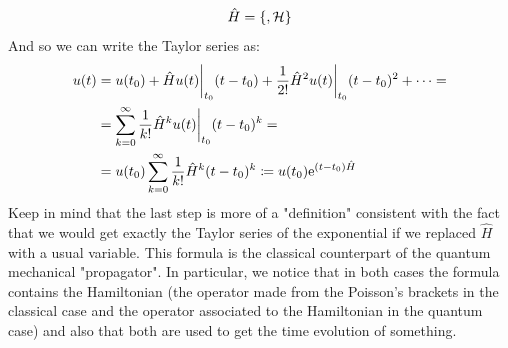 \begin{equation}
  \hat{H} = \pb{}{\hamfun}
\end{equation}
And so we can write the Taylor series as:
\begin{equation}
  \begin{split}
    u(t) &= u(t_0) + \hat{H}u(t)\bigg|_{t_0} (t - t_0) + \frac{1}{2!} \hat{H}^2u(t)\bigg|_{t_0} (t - t_0)^2 + \dots =\\
    &= \displaystyle\sum_{k=0}^\infty \dfrac{1}{k!} \hat{H}^k u(t)\bigg|_{t_0}(t - t_0)^k =\\
    &= u(t_0)\displaystyle\sum_{k=0}^\infty \dfrac{1}{k!} \hat{H}^k (t - t_0)^k \coloneqq u(t_0) \mathrm{e}^{\left(t-t_0\right)\hat{H}}
  \end{split}
\end{equation}
Keep in mind that the last step is more of a "definition" consistent with the fact that we would get exactly the Taylor series of the exponential if we replaced $\hat{H}$ with a usual variable.
This formula is the classical counterpart of the quantum mechanical "propagator". In particular, we notice that in both cases the formula contains the Hamiltonian (the operator made from the Poisson's brackets in the classical case and the operator associated to the Hamiltonian in the quantum case) and also that both are used to get the time evolution of something.
